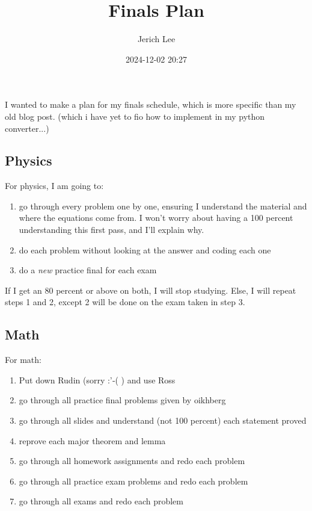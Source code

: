 \documentclass[12pt]{article}
\title{Finals Plan}
\author{Jerich Lee}
\date{2024-12-02 20:27}
\theoremstyle{definition} %
\theoremstyle{plain} %
\begin{document}
\maketitle
I wanted to make a plan for my finals schedule, which is more specific than my old blog post. (which i have yet to fio how to implement in my python converter...)
\subsection{Physics}
For physics, I am going to:
\begin{enumerate}
    \item go through every problem one by one, ensuring I understand the material and where the equations come from. I won't worry about having a 100 percent understanding this first pass, and I'll explain why.
    \item do each problem without looking at the answer and coding each one
    \item do a \emph{new} practice final for each exam
\end{enumerate}
If I get an 80 percent or above on both, I will stop studying. Else, I will repeat steps 1 and 2, except 2 will be done on the exam taken in step 3.
\subsection{Math}
For math:
\begin{enumerate}
    \item Put down Rudin (sorry :'‑( ) and use Ross
    \item go through all practice final problems given by oikhberg
    \item go through all slides and understand (not 100 percent) each statement proved
    \item reprove each major theorem and lemma
    \item go through all homework assignments and redo each problem
    \item go through all practice exam problems and redo each problem
    \item go through all exams and redo each problem
\end{enumerate}
\end{document}
